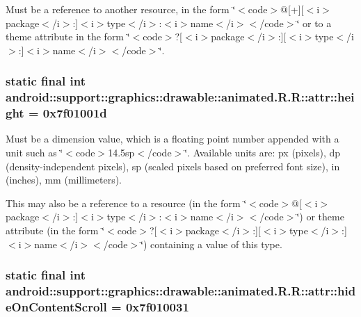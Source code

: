 Must be a reference to another resource, in the form \char`\"{}$<$code$>$@\mbox{[}+\mbox{]}\mbox{[}$<$i$>$package$<$/i$>$:\mbox{]}$<$i$>$type$<$/i$>$:$<$i$>$name$<$/i$>$$<$/code$>$\char`\"{} or to a theme attribute in the form \char`\"{}$<$code$>$?\mbox{[}$<$i$>$package$<$/i$>$:\mbox{]}\mbox{[}$<$i$>$type$<$/i$>$:\mbox{]}$<$i$>$name$<$/i$>$$<$/code$>$\char`\"{}. \hypertarget{classandroid_1_1support_1_1graphics_1_1drawable_1_1animated_1_1_r_1_1attr_df6903c4d762a245c2736223b3b68c98}{
\subsubsection[{height}]{\setlength{\rightskip}{0pt plus 5cm}static final int android::support::graphics::drawable::animated.R.R::attr::height = 0x7f01001d}}
\label{classandroid_1_1support_1_1graphics_1_1drawable_1_1animated_1_1_r_1_1attr_df6903c4d762a245c2736223b3b68c98}


Must be a dimension value, which is a floating point number appended with a unit such as \char`\"{}$<$code$>$14.5sp$<$/code$>$\char`\"{}. Available units are: px (pixels), dp (density-independent pixels), sp (scaled pixels based on preferred font size), in (inches), mm (millimeters). 

This may also be a reference to a resource (in the form \char`\"{}$<$code$>$@\mbox{[}$<$i$>$package$<$/i$>$:\mbox{]}$<$i$>$type$<$/i$>$:$<$i$>$name$<$/i$>$$<$/code$>$\char`\"{}) or theme attribute (in the form \char`\"{}$<$code$>$?\mbox{[}$<$i$>$package$<$/i$>$:\mbox{]}\mbox{[}$<$i$>$type$<$/i$>$:\mbox{]}$<$i$>$name$<$/i$>$$<$/code$>$\char`\"{}) containing a value of this type. \hypertarget{classandroid_1_1support_1_1graphics_1_1drawable_1_1animated_1_1_r_1_1attr_61e3cc3c46d845cbb6a1df1cd6328d66}{
\subsubsection[{hideOnContentScroll}]{\setlength{\rightskip}{0pt plus 5cm}static final int android::support::graphics::drawable::animated.R.R::attr::hideOnContentScroll = 0x7f010031}}
\label{classandroid_1_1support_1_1graphics_1_1drawable_1_1animated_1_1_r_1_1attr_61e3cc3c46d845cbb6a1df1cd6328d66}


